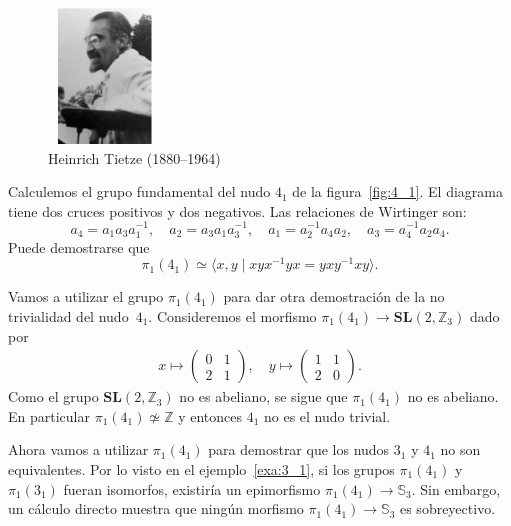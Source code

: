 \documentclass[graybox]{svmult}
\newcommand{\Z}{\mathbb{Z}}
\newcommand{\SL}{\mathbf{SL}}
\newcommand{\Sym}{\mathbb{S}}
\begin{document}
\begin{figure}[ht]
	\centering
    \includegraphics[width=30mm,height=36mm]{images/tietze}
    \caption{Heinrich Tietze (1880--1964)}
\end{figure}

\begin{example}
	\label{exa:4_1}
    Calculemos el grupo fundamental del nudo $4_1$ de la figura~\ref{fig:4_1}.
	El diagrama tiene dos cruces positivos y dos negativos. Las
	relaciones de Wirtinger son:
    \[
        a_4=a_1a_3a_1^{-1},\quad
        a_2=a_3a_1a_3^{-1},\quad
        a_1=a_2^{-1}a_4a_2,\quad           
        a_3=a_4^{-1}a_2a_4.
    \] 
    Puede demostrarse que 
    \[
    \pi_1(4_1)\simeq\langle x,y\mid xyx^{-1}yx=yxy^{-1}xy\rangle.
    \]

    Vamos a utilizar el grupo $\pi_1(4_1)$ para dar otra demostración de la no
    trivialidad del nudo~$4_1$. Consideremos el morfismo
    $\pi_1(4_1)\to\SL(2,\Z_3)$ dado por 
    \begin{align*}
        x\mapsto\begin{pmatrix}
            0 & 1\\
            2 & 1
        \end{pmatrix},\quad
        y\mapsto\begin{pmatrix}
            1 & 1\\
            2 & 0
        \end{pmatrix}.
    \end{align*}
    Como el grupo $\SL(2,\Z_3)$ no es abeliano, se sigue que $\pi_1(4_1)$ no es
    abeliano. En particular $\pi_1(4_1)\not\simeq\Z$ y entonces $4_1$ no es el
    nudo trivial.
\end{example}

\begin{example}
    Ahora vamos a utilizar $\pi_1(4_1)$ para demostrar que los nudos $3_1$ y
    $4_1$ no son equivalentes.  Por lo visto en el ejemplo~\ref{exa:3_1}, si
    los grupos $\pi_1(4_1)$ y $\pi_1(3_1)$ fueran isomorfos, existiría un
    epimorfismo $\pi_1(4_1)\to\Sym_3$. Sin embargo, un cálculo directo muestra
    que ningún morfismo $\pi_1(4_1)\to\Sym_3$ es sobreyectivo.
\end{example}
\end{document}
